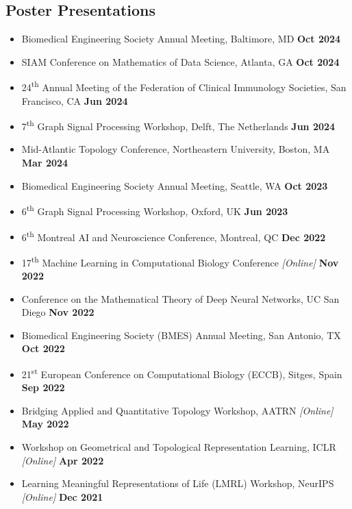 \documentclass[margin,line]{res}
\begin{document}
\begin{resume}
\section{\sc Poster Presentations}
{\renewcommand\leftmargini{0em}
\begin{itemize}
\setlength\itemsep{0.3em}
\item[] Biomedical Engineering Society Annual Meeting, Baltimore, MD \hfill {\bf \small  Oct 2024}
\item[] SIAM Conference on Mathematics of Data Science, Atlanta, GA \hfill {\bf \small Oct 2024}
\item[] {\small 24\textsuperscript{th} Annual Meeting of the Federation of Clinical Immunology Societies, San Francisco, CA} \hfill {\bf \small Jun 2024}
\item[] 7\textsuperscript{th} Graph Signal Processing Workshop, Delft, The Netherlands \hfill {\bf \small Jun 2024}
\item[] Mid-Atlantic Topology Conference, Northeastern University, Boston, MA \hfill {\bf \small Mar 2024}
\item[] Biomedical Engineering Society Annual Meeting, Seattle, WA \hfill {\bf \small  Oct 2023}
\item[] 6\textsuperscript{th} Graph Signal Processing Workshop, Oxford, UK \hfill {\bf \small  Jun 2023}
\item[] 6\textsuperscript{th} Montreal AI and Neuroscience Conference, Montreal, QC \hfill {\bf \small  Dec 2022}
\item[] 17\textsuperscript{th} Machine Learning in Computational Biology Conference \textit{[Online]} \hfill {\bf \small  Nov 2022}
\item[] Conference on the Mathematical Theory of Deep Neural Networks, UC San Diego \hfill {\bf \small  Nov 2022}
\item[] Biomedical Engineering Society (BMES) Annual Meeting, San Antonio, TX \hfill {\bf \small  Oct 2022}
\item[] 21\textsuperscript{st} European Conference on Computational Biology (ECCB), Sitges, Spain \hfill {\bf \small  Sep 2022}
\item[] Bridging Applied and Quantitative Topology Workshop, AATRN \textit{[Online]} \hfill {\bf \small  May 2022}
\item[] Workshop on Geometrical and Topological Representation Learning, ICLR \textit{[Online]} \hfill {\bf \small  Apr 2022} 
\item[] Learning Meaningful Representations of Life (LMRL) Workshop, NeurIPS \textit{[Online]} \hfill {\bf \small  Dec 2021}

\end{itemize}}
\end{resume}
\end{document}
